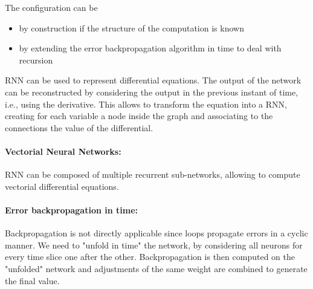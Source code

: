 The configuration can be
\begin{itemize}
	\item by construction if the structure of the computation is known
	\item by extending the error backpropagation algorithm in time to deal with recursion
\end{itemize}

RNN can be used to represent differential equations. The output of the network can be reconstructed by considering the output in the previous instant of time, i.e., using the derivative. This allows to transform the equation into a RNN, creating for each variable a node inside the graph and associating to the connections the value of the differential.\\

\paragraph{Vectorial Neural Networks:} RNN can be composed of multiple recurrent sub-networks, allowing to compute vectorial differential equations.\\

\paragraph{Error backpropagation in time:} Backpropagation is not directly applicable since loops propagate errors in a cyclic manner. We need to "unfold in time" the network, by considering all neurons for every time slice one after the other. Backpropagation is then computed on the "unfolded" network and adjustments of the same weight are combined to generate the final value.\\